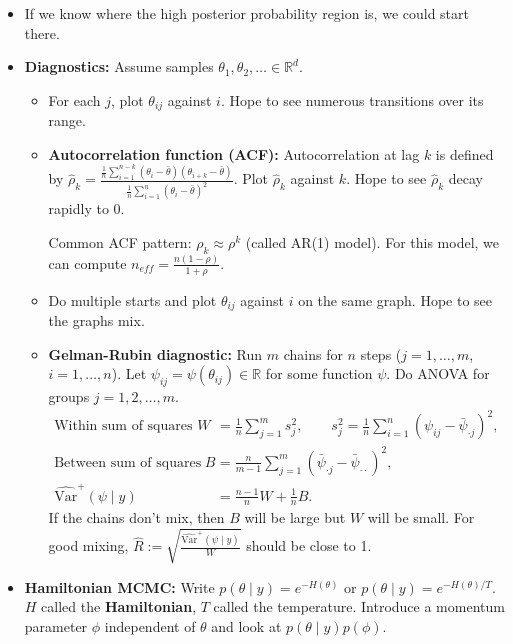 \documentclass[twoside]{article}
\newcommand{\dis}{\displaystyle}
\newcommand\bbR{\mathbb{R}}
\def\t{\theta}
\begin{document}
\begin{itemize}
\item If we know where the high posterior probability region is, we could start there.

\item \textbf{Diagnostics:} Assume samples $\t_1, \t_2, \dots \in \bbR^d$.
\begin{itemize}
\item For each $j$, plot $\t_{ij}$ against $i$. Hope to see numerous transitions over its range.

\item \textbf{Autocorrelation function (ACF):} Autocorrelation at lag $k$ is defined by $\hat{\rho}_k = \dis\frac{\frac{1}{n}\sum_{i=1}^{n-k}(\t_i - \bar{\t})(\t_{i+k}-\bar{\t})}{\frac{1}{n}\sum_{i=1}^n (\t_i - \bar{\t})^2}$. Plot $\hat{\rho}_k$ against $k$. Hope to see $\hat{\rho}_k$ decay rapidly to 0.

Common ACF pattern: $\rho_k \approx \rho^k$ (called AR(1) model). For this model, we can compute $n_{eff} = \dis\frac{n(1-\rho)}{1+\rho}$.

\item Do multiple starts and plot $\t_{ij}$ against $i$ on the same graph. Hope to see the graphs mix.

\item \textbf{Gelman-Rubin diagnostic:} Run $m$ chains for $n$ steps ($j = 1, \dots, m$, $i = 1, \dots, n$). Let $\psi_{ij} = \psi(\t_{ij}) \in \bbR$ for some function $\psi$. Do ANOVA for groups $j = 1, 2, \dots, m$.
\begin{align*}
\text{Within sum of squares } W &= \frac{1}{n}\sum_{j=1}^m s_j^2, \qquad s_j^2 = \frac{1}{n}\sum_{i=1}^n (\psi_{ij} - \bar{\psi}_{\cdot j})^2, \\ 
\text{Between sum of squares } B &= \frac{n}{m-1}\sum_{j=1}^m (\bar{\psi}_{\cdot j} - \bar{\psi}_{\cdot \cdot})^2, \\ 
\widehat{\text{Var}}^+(\psi \mid y) &= \frac{n-1}{n}W + \frac{1}{n}B.
\end{align*}
If the chains don't mix, then $B$ will be large but $W$ will be small. For good mixing, $\hat{R} := \sqrt{\dis\frac{\widehat{\text{Var}}^+(\psi \mid y)}{W}}$ should be close to 1.
\end{itemize}

\item \textbf{Hamiltonian MCMC:} Write $p(\t \mid y) = e^{-H(\t)}$ or $p(\t \mid y) = e^{-H(\t)/T}$. $H$ called the \textbf{Hamiltonian}, $T$ called the temperature. Introduce a momentum parameter $\phi$ independent of $\t$ and look at $p(\t \mid y) p(\phi)$.
\end{itemize}
\end{document}
